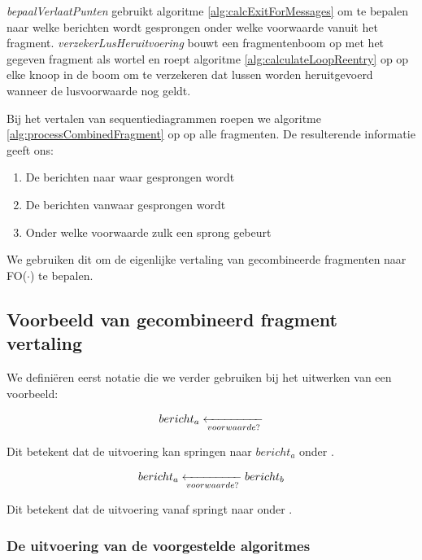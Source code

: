 \textit{bepaalVerlaatPunten} gebruikt algoritme \ref{alg:calcExitForMessages} om te bepalen naar welke berichten wordt gesprongen onder welke voorwaarde vanuit het fragment. \textit{verzekerLusHeruitvoering} bouwt een fragmentenboom op met het gegeven fragment als wortel en roept algoritme \ref{alg:calculateLoopReentry} op op elke knoop in de boom om te verzekeren dat lussen worden heruitgevoerd wanneer de lusvoorwaarde nog geldt.

Bij het vertalen van sequentiediagrammen roepen we algoritme \ref{alg:processCombinedFragment} op op alle fragmenten. De resulterende informatie geeft ons:

\begin{enumerate}
	\item De berichten naar waar gesprongen wordt
	\item De berichten vanwaar gesprongen wordt
	\item Onder welke voorwaarde zulk een sprong gebeurt
\end{enumerate}

We gebruiken dit om de eigenlijke vertaling van gecombineerde fragmenten naar FO($\cdot$) te bepalen.

\subsection{Voorbeeld van gecombineerd fragment vertaling}

We defini\"eren eerst notatie die we verder gebruiken bij het uitwerken van een voorbeeld:

\begin{align*}
	\transitionentry{\fragcond{voorwaarde}}{\fragmessage{$bericht_a$}}
\end{align*}

Dit betekent dat de uitvoering kan springen naar $bericht_a$ onder \textit{}.

\begin{align*}
	\transitionentry[\fragmessage{$bericht_b$}]{\fragcond{voorwaarde}}{\fragmessage{$bericht_a$}}
\end{align*}

Dit betekent dat de uitvoering vanaf  springt naar  onder \textit{}.

\subsubsection{De uitvoering van de voorgestelde algoritmes}

